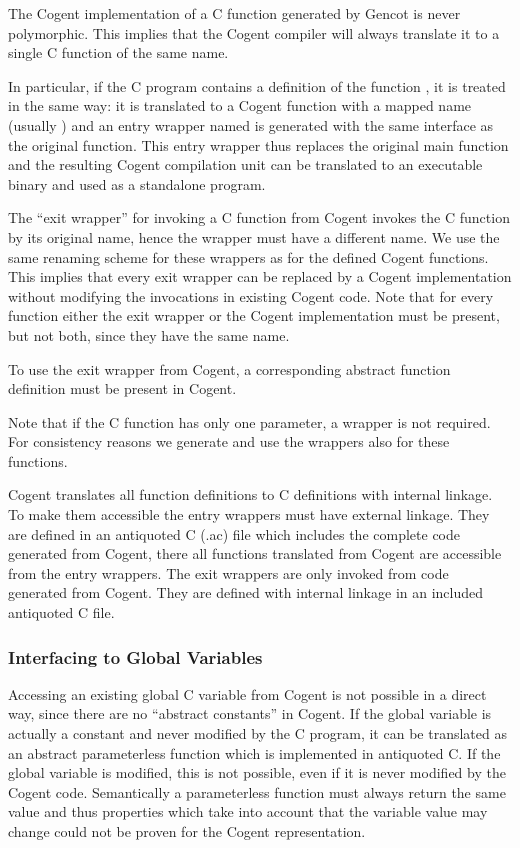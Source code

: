 The Cogent implementation of a C function generated by Gencot is never polymorphic. This implies that the Cogent compiler
will always translate it to a single C function of the same name.

In particular, if the C program contains a definition of the function , it is treated in the same way: it is 
translated to a Cogent function with a mapped name (usually ) and an entry wrapper named 
is generated with the same interface as the original  function. This entry wrapper thus replaces the original
main function and the resulting Cogent compilation unit can be translated to an executable binary and used as a standalone 
program.

The ``exit wrapper'' for invoking a C function from Cogent invokes the C function by its original name, hence the wrapper
must have a different name. We use the same renaming scheme for these wrappers as for the defined Cogent functions.
This implies that every exit wrapper
can be replaced by a Cogent implementation without modifying the invocations in existing Cogent code. Note that for every
function either the exit wrapper or the Cogent implementation must be present, but not both, since they have the same name.

To use the exit wrapper from Cogent, a corresponding abstract function definition must be present in Cogent.

Note that if the C function has only one parameter, a wrapper is not required. For consistency reasons we generate and use
the wrappers also for these functions.

Cogent translates all function definitions to C definitions with internal linkage. To make them accessible the entry wrappers
must have external linkage. They are defined in an antiquoted C (.ac) file which includes the complete code generated from 
Cogent, there all functions translated from Cogent are accessible from the entry wrappers. The exit wrappers are only invoked 
from code generated from Cogent. They are defined with internal linkage in an included antiquoted C file.

\subsubsection{Interfacing to Global Variables}

Accessing an existing global C variable from Cogent is not possible in a direct way, since there are no ``abstract constants'' in 
Cogent. If the global variable is actually a constant and never modified by the C program, it can be translated as an abstract
parameterless function which is implemented in antiquoted C. If the global variable is modified, this is not possible, even if 
it is never modified by the Cogent code. Semantically a parameterless function must always return the same value and thus
properties which take into account that the variable value may change could not be proven for the Cogent representation.

